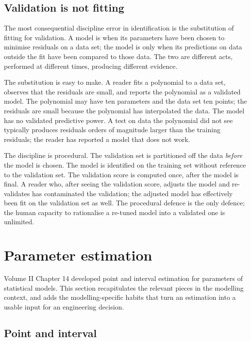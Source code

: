 \subsection{Validation is not fitting}

The most consequential discipline error in identification is the
substitution of fitting for validation. A model is 
when its parameters have been chosen to minimise residuals on a
data set; the model is  only when its
predictions on data outside the fit have been compared to those
data. The two are different acts, performed at different times,
producing different evidence.

The substitution is easy to make. A reader fits a polynomial to a
data set, observes that the residuals are small, and reports the
polynomial as a validated model. The polynomial may have ten
parameters and the data set ten points; the residuals are small
because the polynomial has interpolated the data. The model has
no validated predictive power. A test on data the polynomial did
not see typically produces residuals orders of magnitude larger
than the training residuals; the reader has reported a model
that does not work.

The discipline is procedural. The validation set is partitioned
off the data \emph{before} the model is chosen. The model is
identified on the training set without reference to the
validation set. The validation score is computed once, after the
model is final. A reader who, after seeing the validation score,
adjusts the model and re-validates has contaminated the
validation; the adjusted model has effectively been fit on the
validation set as well. The procedural defence is the only
defence; the human capacity to rationalise a re-tuned model into
a validated one is unlimited.

\section{Parameter estimation}

Volume II Chapter 14 developed point and interval estimation for
parameters of statistical models. This section recapitulates the
relevant pieces in the modelling context, and adds the
modelling-specific habits that turn an estimation into a usable
input for an engineering decision.

\subsection{Point and interval}

